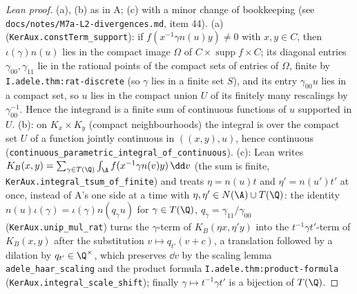 \begin{proof}[Lean proof]
(a), (b) as in A; (c) with a minor change of bookkeeping (see \texttt{docs/notes/M7a-L2-divergences.md}, item 44). (a) (\texttt{KerAux.constTerm\_support}): if $f(x^{-1}\gamma n(u)y)\ne0$ with $x,y\in C$, then $\iota(\gamma)n(u)$ lies in the compact image $\Omega$ of $C\times\operatorname{supp}f\times C$; its diagonal entries $\gamma_{00},\gamma_{11}$ lie in the rational points of the compact sets of entries of $\Omega$, finite by \texttt{I.adele.thm:rat-discrete} (so $\gamma$ lies in a finite set $S$), and its entry $\gamma_{00}u$ lies in a compact set, so $u$ lies in the compact union $U$ of its finitely many rescalings by $\gamma_{00}^{-1}$. Hence the integrand is a finite sum of continuous functions of $u$ supported in $U$. (b): on $K_x\times K_y$ (compact neighbourhoods) the integral is over the compact set $U$ of a function jointly continuous in $((x,y),u)$, hence continuous (\texttt{continuous\_parametric\_integral\_of\_continuous}). (c): Lean writes $K_B(x,y)=\sum_{\gamma\in T(\Q)}\int_\A f(x^{-1}\gamma n(v)y)\,\dd v$ (the sum is finite, \texttt{KerAux.integral\_tsum\_of\_finite}) and treats $\eta=n(u)t$ and $\eta'=n(u')t'$ at once, instead of A's one side at a time with $\eta,\eta'\in N(\A)\cup T(\Q)$: the identity $n(u)\iota(\gamma)=\iota(\gamma)n(q_\gamma u)$ for $\gamma\in T(\Q)$, $q_\gamma=\gamma_{11}/\gamma_{00}$ (\texttt{KerAux.unip\_mul\_rat}) turns the $\gamma$-term of $K_B(\eta x,\eta'y)$ into the $t^{-1}\gamma t'$-term of $K_B(x,y)$ after the substitution $v\mapsto q_{t'}(v+c)$, a translation followed by a dilation by $q_{t'}\in\Q^\times$, which preserves $\dd v$ by the scaling lemma \texttt{adele\_haar\_scaling} and the product formula \texttt{I.adele.thm:product-formula} (\texttt{KerAux.integral\_scale\_shift}); finally $\gamma\mapsto t^{-1}\gamma t'$ is a bijection of $T(\Q)$.
\end{proof}

